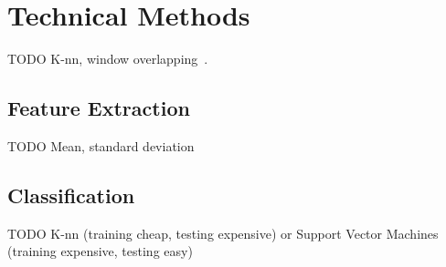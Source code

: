 \section{Technical Methods}
\label{sec:technical-methods}
TODO K-nn, window overlapping~\cite{ravi2005activity}.

\subsection{Feature Extraction}
\label{sec:feature-extraction}
TODO Mean, standard deviation

\subsection{Classification}
\label{sec:classification}
TODO K-nn (training cheap, testing expensive) or Support Vector Machines (training expensive, testing easy)
